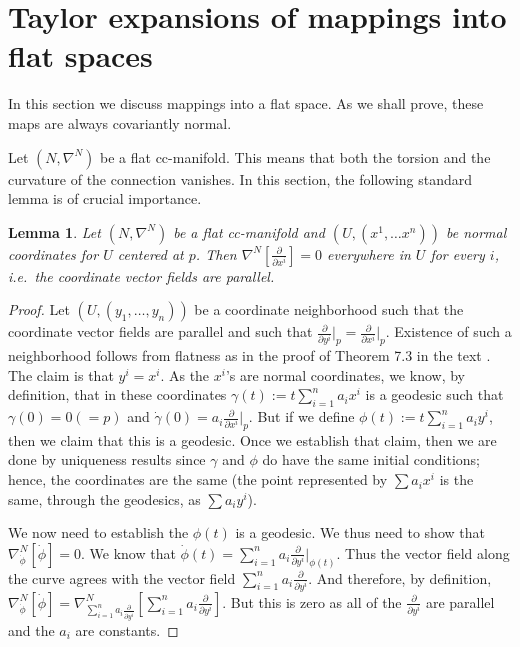 \documentclass[11pt]{article}
\newtheorem{lemma}{Lemma}
\theoremstyle{remark}
\begin{document}
\section{Taylor expansions of mappings into flat spaces}

In this section we discuss mappings into a flat space. As we shall
prove, these maps are always covariantly normal. 


Let $(N, \nabla^N)$ 
be a flat cc-manifold. This means that both the torsion and the
curvature of the connection vanishes. In this section, the following
standard lemma is of crucial importance.

\begin{lemma} \label{tl:flat}
Let $(N, \nabla^N)$ 
be a flat cc-manifold and $(U, (x^1, \ldots x^n))$ be normal
coordinates for $U$ centered at $p$. 
Then $\nabla^N [\ensuremath{\frac{\partial {}}{\partial {x^i}}}] =0 $ everywhere in
$U$ for every $i$, i.e.\ the coordinate vector fields are parallel.  
\end{lemma}


\begin{proof}
Let $(U, (y_1,\ldots, y_n))$ be a coordinate neighborhood such that 
the coordinate vector fields are parallel and such that $\ensuremath{\frac{\partial {}}{\partial {y^i}}}\vert_p =
\ensuremath{\frac{\partial {}}{\partial {x^i}}}\vert_p$. Existence of such a
neighborhood follows from 
flatness as in the proof of Theorem 7.3 in the text \cite{Lee98}. 
The claim is that $y^i = x^i$. As the $x^i$'s are normal coordinates,
we know, by definition, that in these coordinates 
 $\gamma (t) \ensuremath{:=} t\sum_{i=1}^n a_i x^i$
is a geodesic such that $\gamma(0) = 0 (=p)$ and 
 $\dot{\gamma}(0) = a_i \ensuremath{\frac{\partial {}}{\partial {x^i}}}\vert_p$. But if we define
$\phi(t) \ensuremath{:=} t\sum_{i=1}^n a_i y^i$, then we claim that this is a
geodesic.  Once we establish that claim, then we are done by
uniqueness results since
$\gamma$ and $\phi$ do have the same initial conditions; hence, the
coordinates are the same (the point represented by $\sum a_i x^i$ is
the same, through the geodesics, as $\sum a_i y^i$).

We now need to establish the $\phi(t)$ is a geodesic. We thus need to
show that $\ensuremath{{{\nabla}}_{\dot{\phi}}^{N}{[\dot{\phi}]}} = 0$. We know that
$\dot{\phi} (t) = \sum_{i=1}^n a_i \ensuremath{\frac{\partial {}}{\partial {y^i}}} \vert_{\phi(t)}$. Thus
the vector field along the curve agrees with the vector field
$\sum_{i=1}^n a_i \ensuremath{\frac{\partial {}}{\partial {y^i}}}$. And therefore, by definition, 
$\ensuremath{{{\nabla}}_{\dot{\phi}}^{N}{[\dot{\phi}]}} = \ensuremath{{{\nabla}}_{\sum_{i=1}^n a_i
\ensuremath{\frac{\partial {}}{\partial {y^i}}}}^{N}{[\sum_{i=1}^n a_i \ensuremath{\frac{\partial {}}{\partial {y^i}}}]}}$. But this is zero as all
of the $\ensuremath{\frac{\partial {}}{\partial {y^i}}}$ are parallel and the $a_i$ are constants. 
\end{proof}
\end{document}
